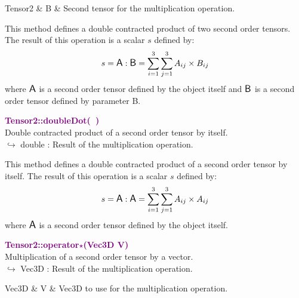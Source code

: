 \begin{tcolorbox}[width=\textwidth,myArgs,tabularx={ll|R}]
Tensor2 & B & Second tensor for the multiplication operation.
\end{tcolorbox}

This method defines a double contracted product of two second order tensors.
The result of this operation is a scalar $s$ defined by:
\begin{equation*}
s = \mbox{\large\ensuremath{\mathsf{A}}} : \mbox{\large\ensuremath{\mathsf{B}}} = \sum_{i=1}^{3} \sum_{j=1}^{3} A_{ij}\times B_{ij}
\end{equation*}
where $\mbox{\large\ensuremath{\mathsf{A}}}$ is a second order tensor defined by the object itself and $\mbox{\large\ensuremath{\mathsf{B}}}$ is a second order tensor defined by parameter B.

\textcolor{purple}{\textbf{Tensor2::doubleDot(~)}}\label{Tensor2::doubleDot()}\\
Double contracted product of a second order tensor by itself.\\ \hspace*{10mm}$\hookrightarrow$ double : Result of the multiplication operation.

This method defines a double contracted product of a second order tensor by itself.
The result of this operation is a scalar $s$ defined by:
\begin{equation*}
s = \mbox{\large\ensuremath{\mathsf{A}}} : \mbox{\large\ensuremath{\mathsf{A}}} = \sum_{i=1}^{3} \sum_{j=1}^{3} A_{ij}\times A_{ij}
\end{equation*}
where $\mbox{\large\ensuremath{\mathsf{A}}}$ is a second order tensor defined by the object itself.

\textcolor{purple}{\textbf{Tensor2::operator$\star$(Vec3D V)}}\label{Tensor2::operator*(Vec3D V)}\\
Multiplication of a second order tensor by a vector.\\ \hspace*{10mm}$\hookrightarrow$ Vec3D : Result of the multiplication operation.

\begin{tcolorbox}[width=\textwidth,myArgs,tabularx={ll|R}]
Vec3D & V & Vec3D to use for the multiplication operation.
\end{tcolorbox}


